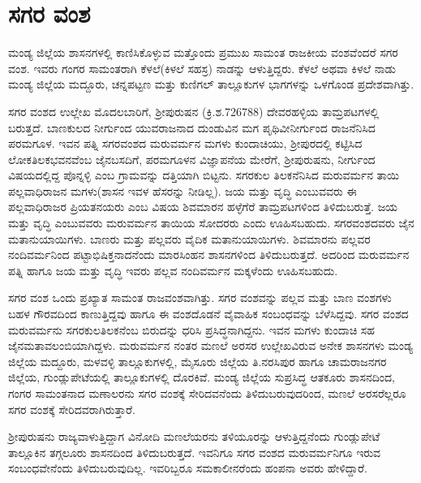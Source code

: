 \section{ಸಗರ ವಂಶ}

ಮಂಡ್ಯ ಜಿಲ್ಲೆಯ ಶಾಸನಗಳಲ್ಲಿ ಕಾಣಿಸಿಕೊಳ್ಳುವ ಮತ್ತೊಂದು ಪ್ರಮುಖ ಸಾಮಂತ ರಾಜಕೀಯ ವಂಶವೆಂದರೆ ಸಗರ ವಂಶ. ಇವರು ಗಂಗರ ಸಾಮಂತರಾಗಿ ಕೆಳಲೆ(ಕಿಳಲೆ ಸಹಸ್ರ) ನಾಡನ್ನು ಆಳುತ್ತಿದ್ದರು. ಕೆಳಲೆ ಅಥವಾ ಕಿಳಲೆ ನಾಡು ಮಂಡ್ಯ ಜಿಲ್ಲೆಯ ಮದ್ದೂರು, ಚನ್ನಪಟ್ಟಣ ಮತ್ತು ಕುಣಿಗಲ್​ ತಾಲ್ಲೂಕುಗಳ ಭಾಗಗಳನ್ನು ಒಳಗೊಂಡ ಪ್ರದೇಶವಾಗಿತ್ತು.

ಸಗರ ವಂಶದ ಉಲ್ಲೇಖ ಮೊದಲಬಾರಿಗೆ, ಶ‍್ರೀಪುರುಷನ (ಕ್ರಿ.ಶ.726788) ದೇವರಹಳ್ಳಿಯ ತಾಮ್ರಪಟಗಳಲ್ಲಿ ಬರುತ್ತದೆ. ಬಾಣಕುಲದ ನೀರ್ಗುಂದ ಯುವರಾಜನಾದ ದುಂಡುವಿನ ಮಗ ಪೃಥಿವೀನೀರ್ಗುಂದ ರಾಜನೆನಿಸಿದ ಪರಮಗೂಳ. ಇವನ ಪತ್ನಿ ಸಗರವಂಶದ ಮರುವರ್ಮನ ಮಗಳು ಕುಂದಾಚಿಯು, ಶ‍್ರೀಪುರದಲ್ಲಿ ಕಟ್ಟಿಸಿದ ಲೋಕತಿಲಕಭವನವೆಂಬ ಜೈನಬಸದಿಗೆ, ಪರಮಗೂಳನ ವಿಜ್ಞಾಪನೆಯ ಮೇರೆಗೆ, ಶ‍್ರೀಪುರುಷನು, ನೀರ್ಗುಂದ ವಿಷಯದಲ್ಲಿದ್ದ ಪೊನ್ನಳ್ಳಿ ಎಂಬ ಗ್ರಾಮವನ್ನು ದತ್ತಿಯಾಗಿ ಬಿಟ್ಟನು. ಸಗರಕುಲ ತಿಲಕನೆನಿಸಿದ ಮರುವರ್ಮನ ತಾಯಿ ಪಲ್ಲವಾಧಿರಾಜನ ಮಗಳು(ಶಾಸನ ಇವಳ ಹೆಸರನ್ನು ನೀಡಿಲ್ಲ). ಜಯ ಮತ್ತು ವೃದ್ಧಿ ಎಂಬುವವರು ಈ ಪಲ್ಲವಾಧಿರಾಜರ ಪ್ರಿಯತನಯರು ಎಂಬ ವಿಷಯ ಶಿವಮಾರನ ಹಳ್ಳೆಗೆರೆ ತಾಮ್ರಪಟಗಳಿಂದ ತಿಳಿದುಬರುತ್ತೆ. ಜಯ ಮತ್ತು ವೃದ್ಧಿ ಎಂಬುವವರು ಮರುವರ್ಮನ ತಾಯಿಯ ಸೋದರರು ಎಂದು ಊಹಿಸಬಹುದು. ಸಗರವಂಶದವರು ಜೈನ ಮತಾನುಯಾಯಿಗಳು. ಬಾಣರು ಮತ್ತು ಪಲ್ಲವರು ವೈದಿಕ ಮತಾನುಯಾಯಿಗಳು. ಶಿವಮಾರನು ಪಲ್ಲವರ ನಂದಿವರ್ಮನಿಂದ ಪಟ್ಟಾಭಿಷಿಕ್ತನಾದನೆಂದು ಮಾರಸಿಂಹನ ಶಾಸನಗಳಿಂದ ತಿಳಿದುಬರುತ್ತದೆ. ಅದರಿಂದ ಮರುವರ್ಮನ ಪತ್ನಿ ಹಾಗೂ ಜಯ ಮತ್ತು ವೃದ್ಧಿ ಇವರು ಪಲ್ಲವ ನಂದಿವರ್ಮನ ಮಕ್ಕಳೆಂದು ಊಹಿಸಬಹುದು.

ಸಗರ ವಂಶ ಒಂದು ಪ್ರಖ್ಯಾತ ಸಾಮಂತ ರಾಜವಂಶವಾಗಿತ್ತು. ಸಗರ ವಂಶವನ್ನು ಪಲ್ಲವ ಮತ್ತು ಬಾಣ ವಂಶಗಳು ಬಹಳ ಗೌರವದಿಂದ ಕಾಣುತ್ತಿದ್ದವು ಹಾಗೂ ಈ ವಂಶದೊಡನೆ ವೈವಾಹಿಕ ಸಂಬಂಧವನ್ನು ಬೆಳೆಸಿದ್ದವು. ಸಗರ ವಂಶದ ಮರುವರ್ಮನು ಸಗರಕುಲತಿಲಕನೆಂಬ ಬಿರುದನ್ನು ಧರಿಸಿ ಪ್ರಸಿದ್ಧನಾಗಿದ್ದನು. ಇವನ ಮಗಳು ಕುಂದಾಚಿ ಸಹ ಜೈನಮತಾವಲಂಬಿಯಾಗಿದ್ದಳು. ಮರುವರ್ಮನ ನಂತರ ಮಣಲೆ ಅರಸರ ಉಲ್ಲೇಖವಿರುವ ಅನೇಕ ಶಾಸನಗಳು ಮಂಡ್ಯ ಜಿಲ್ಲೆಯ ಮದ್ದೂರು, ಮಳವಳ್ಳಿ ತಾಲ್ಲೂಕುಗಳಲ್ಲಿ, ಮೈಸೂರು ಜಿಲ್ಲೆಯ ತಿ.ನರಸಿಪುರ ಹಾಗೂ ಚಾಮರಾಜನಗರ ಜಿಲ್ಲೆಯ, ಗುಂಡ್ಲುಪೇಟೆಯಲ್ಲಿ ತಾಲ್ಲೂಕುಗಳಲ್ಲಿ ದೊರಕಿವೆ. ಮಂಡ್ಯ ಜಿಲ್ಲೆಯ ಸುಪ್ರಸಿದ್ಧ ಆತಕೂರು ಶಾಸನದಿಂದ, ಗಂಗರ ಸಾಮಂತನಾದ ಮಣಾಲರನು ಸಗರ ವಂಶಕ್ಕೆ ಸೇರಿದವನೆಂದು ತಿಳಿದುಬರುವುದರಿಂದ, ಮಣಲೆ ಅರಸರೆಲ್ಲರೂ ಸಗರ ವಂಶಕ್ಕೆ ಸೇರಿದವರಾಗಿರುತ್ತಾರೆ.

ಶ‍್ರೀಪುರುಷನು ರಾಜ್ಯವಾಳುತ್ತಿದ್ದಾಗ ವಿನೋದಿ ಮಣಲೆಯರನು ತಳಿಯೂರನ್ನು ಆಳುತ್ತಿದ್ದನೆಂದು ಗುಂಡ್ಲುಪೇಟೆ ತಾಲ್ಲೂಕಿನ ತಗ್ಗಲೂರು ಶಾಸನದಿಂದ ತಿಳಿದುಬರುತ್ತದೆ. ಇವನಿಗೂ ಸಗರ ವಂಶದ ಮರುವರ್ಮನಿಗೂ ಇರುವ ಸಂಬಂಧವೇನೆಂದು ತಿಳಿದುಬರುವುದಿಲ್ಲ. ಇವರಿಬ್ಬರೂ ಸಮಕಾಲೀನರೆಂದು ಹಂಪನಾ ಅವರು ಹೇಳಿದ್ದಾರೆ.


